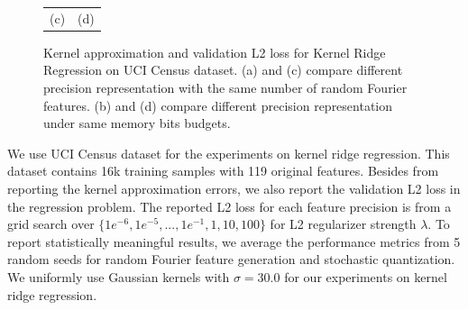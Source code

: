 \begin{figure}
\begin{tabular}{c c}
		(c) & (d) \\
\end{tabular}
\caption{Kernel approximation and validation L2 loss for Kernel Ridge Regression on UCI Census dataset. (a) and (c) compare different precision representation with the same number of random Fourier features. (b) and (d) compare different precision representation under same memory bits budgets.}
\label{fig:kernel_and_l2}
\end{figure}

We use UCI Census dataset for the experiments on kernel ridge regression. This dataset contains 16k training samples with 119 original features. Besides from reporting the kernel approximation errors, we also report the validation L2 loss in the regression problem. The reported L2 loss for each feature precision is from a grid search over $\{1e^{-6}, 1e^{-5}, ..., 1e^{-1}, 1, 10, 100\}$ for L2 regularizer strength $\lambda$. To report statistically meaningful results, we average the performance metrics from 5 random seeds for random Fourier feature generation and stochastic quantization. We uniformly use Gaussian kernels with $\sigma=30.0$ for our experiments on kernel ridge regression.

